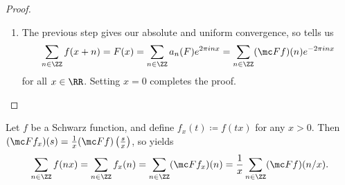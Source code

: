 \documentclass[../notes.tex]{subfiles}
\begin{document}
\begin{proof}
\begin{enumerate}
		\item The previous step gives our absolute and uniform convergence, so  tells us
		\[\sum_{n\in\ZZ}f(x+n)=F(x)=\sum_{n\in\ZZ}a_n(F)e^{2\pi inx}=\sum_{n\in\ZZ}(\mc Ff)(n)e^{-2\pi inx}\]
		for all $x\in\RR$. Setting $x=0$ completes the proof.
		\qedhere
	\end{enumerate}
\end{proof}
\begin{example}
	Let $f$ be a Schwarz function, and define $f_x(t)\coloneqq f(tx)$ for any $x>0$. Then $(\mc Ff_x)(s)=\frac1x(\mc Ff)\left(\frac sx\right)$, so  yields
	\[\sum_{n\in\ZZ}f(nx)=\sum_{n\in\ZZ}f_x(n)=\sum_{n\in\ZZ}(\mc Ff_x)(n)=\frac1x\sum_{n\in\ZZ}(\mc Ff)(n/x).\]
\end{example}
\end{document}
